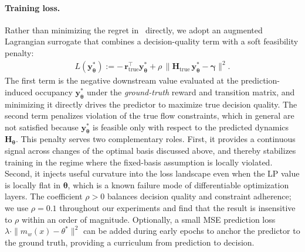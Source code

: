 \paragraph{Training loss.}
Rather than minimizing the regret in~ directly, we adopt an augmented Lagrangian surrogate that combines a decision-quality term with a soft feasibility penalty:
\begin{align}
    L(\bm{y}^*_{\bm{\theta}})
    := -\,\bm{r}_{\mathrm{true}}^\top \bm{y}^*_{\bm{\theta}}
       + \rho\, \big\|\bm{H}_{\mathrm{true}}\, \bm{y}^*_{\bm{\theta}} - \bm{\gamma}\big\|^2.
    \label{eq:dfl_loss}
\end{align}
The first term is the negative downstream value evaluated at the prediction-induced occupancy $\bm{y}^*_{\bm{\theta}}$ under the \emph{ground-truth} reward and transition matrix, and minimizing it directly drives the predictor to maximize true decision quality. The second term penalizes violation of the true flow constraints, which in general are not satisfied because $\bm{y}^*_{\bm{\theta}}$ is feasible only with respect to the predicted dynamics $\bm{H}_{\bm{\theta}}$. This penalty serves two complementary roles. First, it provides a continuous signal across changes of the optimal basis discussed above, and thereby stabilizes training in the regime where the fixed-basis assumption is locally violated. Second, it injects useful curvature into the loss landscape even when the LP value is locally flat in $\bm{\theta}$, which is a known failure mode of differentiable optimization layers. The coefficient $\rho > 0$ balances decision quality and constraint adherence; we use $\rho = 0.1$ throughout our experiments and find that the result is insensitive to $\rho$ within an order of magnitude. Optionally, a small MSE prediction loss $\lambda \cdot \|m_w(x) - \theta^*\|^2$ can be added during early epochs to anchor the predictor to the ground truth, providing a curriculum from prediction to decision.

